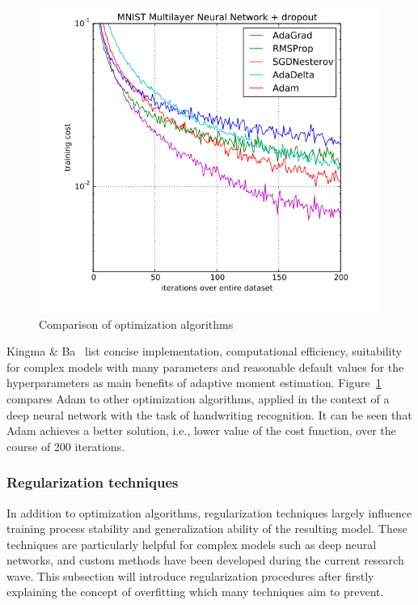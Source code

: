 \begin{figure}[h]
  \centering
  \includegraphics[height=10cm]{img/adam_comparison}
  \caption[Comparison of optimization algorithms]{Comparison of optimization algorithms~\cite{Kingma2014a}}
\label{fig:adam_comp}
\end{figure}

Kingma \& Ba~\cite{Kingma2014a} list concise implementation, computational efficiency,
suitability for complex models with many parameters and reasonable default values
for the hyperparameters as main benefits of adaptive moment estimation.
Figure~\ref{fig:adam_comp} compares Adam to other optimization algorithms,
applied in the context of a deep neural network with the task of handwriting
recognition.
It can be seen that Adam achieves a better solution, i.e., lower value of the
cost function, over the course of 200 iterations.

\subsubsection{Regularization techniques}
\label{sub:dl_regularization}

In addition to optimization algorithms, regularization techniques largely
influence training process stability and generalization ability of the
resulting model.
These techniques are particularly helpful for complex models such as deep
neural networks, and custom methods have been developed during the current
research wave.
This subsection will introduce regularization procedures after firstly explaining
the concept of overfitting which many techniques aim to prevent.

